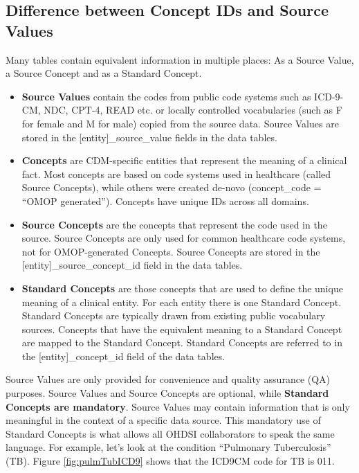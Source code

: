 \documentclass[11pt]{book}
\providecommand{\tightlist}{%
  \setlength{\itemsep}{0pt}\setlength{\parskip}{0pt}}
\theoremstyle{definition}
\theoremstyle{definition}
\theoremstyle{definition}
\theoremstyle{remark}
\begin{document}
\hypertarget{concepts-sources}{%
\subsection{Difference between Concept IDs and Source Values}\label{concepts-sources}}

Many tables contain equivalent information in multiple places: As a Source Value, a Source Concept and as a Standard Concept.

\begin{itemize}
\tightlist
\item
  \textbf{Source Values} contain the codes from public code systems such as ICD-9-CM, NDC, CPT-4, READ etc. or locally controlled vocabularies (such as F for female and M for male) copied from the source data. Source Values are stored in the {[}entity{]}\_source\_value fields in the data tables.
\item
  \textbf{Concepts} are CDM-specific entities that represent the meaning of a clinical fact. Most concepts are based on code systems used in healthcare (called Source Concepts), while others were created de-novo (concept\_code = ``OMOP generated''). Concepts have unique IDs across all domains.
\item
  \textbf{Source Concepts} are the concepts that represent the code used in the source. Source Concepts are only used for common healthcare code systems, not for OMOP-generated Concepts. Source Concepts are stored in the {[}entity{]}\_source\_concept\_id field in the data tables.
\item
  \textbf{Standard Concepts} are those concepts that are used to define the unique meaning of a clinical entity. For each entity there is one Standard Concept. Standard Concepts are typically drawn from existing public vocabulary sources. Concepts that have the equivalent meaning to a Standard Concept are mapped to the Standard Concept. Standard Concepts are referred to in the {[}entity{]}\_concept\_id field of the data tables.
\end{itemize}

Source Values are only provided for convenience and quality assurance (QA) purposes. Source Values and Source Concepts are optional, while \textbf{Standard Concepts are mandatory}. Source Values may contain information that is only meaningful in the context of a specific data source. This mandatory use of Standard Concepts is what allows all OHDSI collaborators to speak the same language. For example, let's look at the condition ``Pulmonary Tuberculosis'' (TB). Figure \ref{fig:pulmTubICD9} shows that the ICD9CM code for TB is 011.
\end{document}
